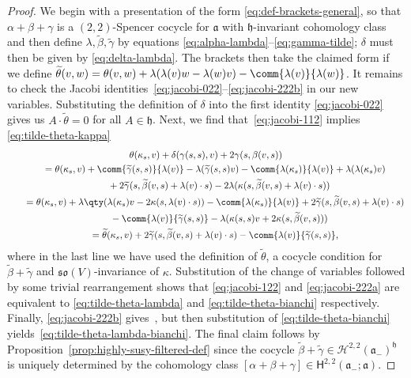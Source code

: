 \documentclass[pdftex]{sigma}
\numberwithin{equation}{section}
\newcommand{\fa}{\mathfrak{a}}
\newcommand{\fh}{\mathfrak{h}}
\newcommand{\fso}{\mathfrak{so}}
\newcommand{\cH}{\mathcal{H}}
\newcommand{\ssH}{\mathsf{H}}
\newcommand{\betatilde}{\widetilde{\beta}}
\newcommand{\gammatilde}{\widetilde{\gamma}}
\newcommand{\thetatilde}{\widetilde{\theta}}
\newcommand{\1}{\mathbbm{1}}
\begin{document}
\begin{proof}
	We begin with a presentation of the form \eqref{eq:def-brackets-general}, so that $\alpha+\beta+\gamma$ is a $(2,2)$-Spencer cocycle for $\fa$ with $\fh$-invariant cohomology class and then define $\lambda,\betatilde,\gammatilde$ by equations \eqref{eq:alpha-lambda}--\eqref{eq:gamma-tilde}; $\delta$ must then be given by \eqref{eq:delta-lambda}. The brackets then take the claimed form if we define
$\thetatilde(v,w) = \theta(v,w) + \lambda(\lambda(v)w-\lambda(w)v) - \comm{\lambda(v)}{\lambda(w)}$.
	It remains to check the Jacobi identities~\eqref{eq:jacobi-022}--\eqref{eq:jacobi-222b} in our new variables. Substituting the definition of $\delta$ into the first identity \eqref{eq:jacobi-022} gives us $A\cdot \thetatilde=0$ for all $A\in\fh$. Next, we find that~\eqref{eq:jacobi-112} implies \eqref{eq:tilde-theta-kappa}
	\begin{gather*}
		\theta(\kappa_s,v) + \delta(\gamma(s,s),v) + 2\gamma(s,\beta(v,s)) \\
		\qquad= \theta(\kappa_s,v) + \comm{\gammatilde(s,s)}{\lambda(v)} - \lambda(\gammatilde(s,s)v) - \comm{\lambda(\kappa_s)}{\lambda(v)} + \lambda(\lambda(\kappa_s)v) \\
		\phantom{\qquad=}{}+ 2\gammatilde(s,\betatilde(v,s)+\lambda(v)\cdot s) - 2\lambda(\kappa(s,\betatilde(v,s)+\lambda(v)\cdot s)) \\
	\qquad	= \theta(\kappa_s,v) + \lambda\qty(\lambda(\kappa_s)v - 2\kappa(s,\lambda(v)\cdot s)) - \comm{\lambda(\kappa_s)}{\lambda(v)} + 2\gammatilde(s,\betatilde(v,s)+\lambda(v)\cdot s)\\
			\phantom{\qquad=}{}- \comm{\lambda(v)}{\gammatilde(s,s)}
			- \lambda(\kappa(s,s)v + 2\kappa(s,\betatilde(v,s)))\\
		\qquad= \thetatilde(\kappa_s,v) + 2\gammatilde(s,\betatilde(v,s)+\lambda(v)\cdot s) - \comm{\lambda(v)}{\gammatilde(s,s)},
	\end{gather*}
	where in the last line we have used the definition of $\thetatilde$, a cocycle condition for $\betatilde+\gammatilde$ and $\fso(V)$-invariance of $\kappa$. Substitution of the change of variables followed by some trivial rearrangement shows that \eqref{eq:jacobi-122} and \eqref{eq:jacobi-222a} are equivalent to \eqref{eq:tilde-theta-lambda} and \eqref{eq:tilde-theta-bianchi} respectively. Finally, \eqref{eq:jacobi-222b} gives~\smash{$\bigl(\lambda(u)\cdot\thetatilde\bigr)(v,w)
			+ \lambda\bigl(\thetatilde(u,v)w\bigr)
	+ \text{cyclic perms.}= 0$},
	but then substitution of \eqref{eq:tilde-theta-bianchi} yields~\eqref{eq:tilde-theta-lambda-bianchi}. The final claim follows by Proposition~\ref{prop:highly-susy-filtered-def} since the cocycle $\betatilde+\gammatilde\in\cH^{2,2}(\fa_-)^\fh$ is uniquely determined by the cohomology class $[\alpha+\beta+\gamma]\in\ssH^{2,2}(\fa_-;\fa)$.
\end{proof}
\end{document}
